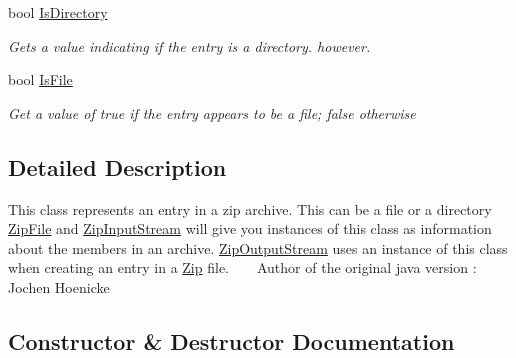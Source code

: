 \begin{DoxyCompactItemize}
bool \hyperlink{class_i_c_sharp_code_1_1_sharp_zip_lib_1_1_zip_1_1_zip_entry_a7246dfbab647be04db33f1482e504636}{Is\+Directory}
\begin{DoxyCompactList}\small\item\em Gets a value indicating if the entry is a directory. however. \end{DoxyCompactList}\item 
bool \hyperlink{class_i_c_sharp_code_1_1_sharp_zip_lib_1_1_zip_1_1_zip_entry_a1a14b7a06b4757930176d2190955a2e3}{Is\+File}
\begin{DoxyCompactList}\small\item\em Get a value of true if the entry appears to be a file; false otherwise \end{DoxyCompactList}\end{DoxyCompactItemize}


\subsection{Detailed Description}
This class represents an entry in a zip archive. This can be a file or a directory \hyperlink{class_i_c_sharp_code_1_1_sharp_zip_lib_1_1_zip_1_1_zip_file}{Zip\+File} and \hyperlink{class_i_c_sharp_code_1_1_sharp_zip_lib_1_1_zip_1_1_zip_input_stream}{Zip\+Input\+Stream} will give you instances of this class as information about the members in an archive. \hyperlink{class_i_c_sharp_code_1_1_sharp_zip_lib_1_1_zip_1_1_zip_output_stream}{Zip\+Output\+Stream} uses an instance of this class when creating an entry in a \hyperlink{namespace_i_c_sharp_code_1_1_sharp_zip_lib_1_1_zip}{Zip} file. ~\newline
 ~\newline
Author of the original java version \+: Jochen Hoenicke 



\subsection{Constructor \& Destructor Documentation}
\mbox{\label{class_i_c_sharp_code_1_1_sharp_zip_lib_1_1_zip_1_1_zip_entry_a0964e8db6ee84b427a99c5439c37104a}} 
